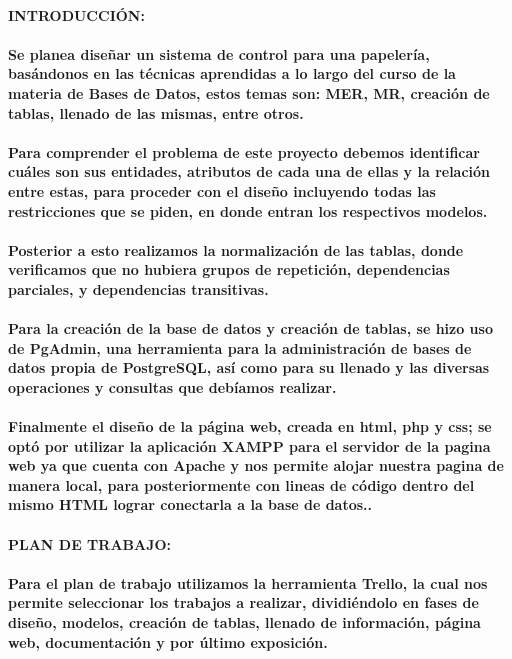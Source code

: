 \documentclass{article}
\begin{document}
	\paragraph{INTRODUCCIÓN:}
	\justifying
	 \paragraph{Se planea diseñar un sistema de control para una papelería, basándonos en las técnicas aprendidas a lo largo del curso de la materia de Bases de Datos, estos temas son: MER, MR, creación de tablas, llenado de las mismas, entre otros. \\ \\
     Para comprender el problema de este proyecto debemos identificar cuáles son sus entidades, atributos de cada una de ellas y la relación entre estas, para proceder con el diseño incluyendo todas las restricciones que se piden, en donde entran los respectivos modelos.\\ \\
     Posterior a esto realizamos la normalización de las tablas, donde verificamos que no hubiera grupos de repetición, dependencias parciales, y dependencias transitivas.\\ \\
	 Para la creación de la base de datos y creación de tablas, se hizo uso de PgAdmin, una herramienta para la administración de bases de datos propia de PostgreSQL, así como para su llenado y las diversas operaciones y consultas que debíamos realizar.\\ \\
     Finalmente el diseño de la página web, creada en html, php y css; se optó por utilizar la aplicación XAMPP para el servidor de la pagina web ya que cuenta con Apache y nos permite alojar nuestra pagina de manera local, para posteriormente con lineas de código dentro del mismo HTML lograr conectarla a la base de datos..}
	 
	 \paragraph{PLAN DE TRABAJO:}
	 \justifying
	 \paragraph{Para el plan de trabajo utilizamos la herramienta Trello, la cual nos permite seleccionar los trabajos a realizar, dividiéndolo en fases de diseño, modelos, creación de tablas, llenado de información, página web, documentación y por último exposición.}
\end{document}
